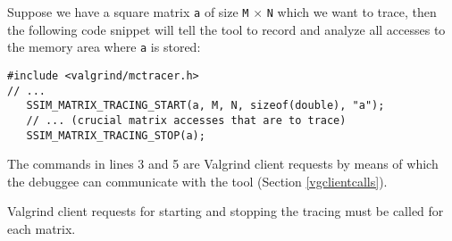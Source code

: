 Suppose we have a square matrix \texttt{a} of size \texttt{M} $\times$ \texttt{N} which we want to trace, then the following code snippet will tell the tool to record and analyze all accesses to the memory area where \texttt{a} is stored:
\begin{lstlisting}
#include <valgrind/mctracer.h>
// ...
   SSIM_MATRIX_TRACING_START(a, M, N, sizeof(double), "a");
   // ... (crucial matrix accesses that are to trace)
   SSIM_MATRIX_TRACING_STOP(a);
\end{lstlisting}
The commands in lines 3 and 5 are Valgrind client requests by means of which the debuggee can communicate with the tool (Section \ref{vgclientcalls}).
%

Valgrind client requests for starting and stopping the tracing must be called for each matrix.


